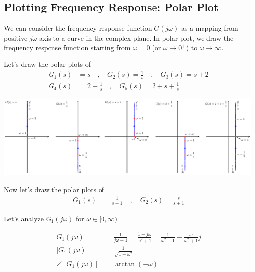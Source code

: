 \documentclass[twoside]{article}
\begin{document}
\newpage

\subsection{Plotting Frequency Response: Polar Plot}

We can consider the frequency response function $G(j \omega)$
as a mapping from positive $j \omega$ axis to a curve in 
the complex plane. In polar plot, we draw the frequency response
function starting from $\omega = 0$ (or $\omega \to 0^+$) to $\omega
\to \infty$.

Let's draw the polar plots of 
%
\begin{align*}
 G_1(s) &= s
 \quad , \quad
 G_2(s) = \frac{1}{s}
 \quad , \quad
 G_3(s) = s + 2
\\
 G_4(s) &= 2 + \frac{1}{s}
\quad , \quad
 G_5(s) = 2 + s +  \frac{1}{s}
\end{align*}

\vspace{6 pt}

  \begin{minipage}[h]{1\linewidth}
    \begin{center}
      \includegraphics[width=0.99\textwidth]{polar}
    \end{center}
  \end{minipage}

\vspace{6 pt}

Now let's draw the polar plots of 
%
\begin{align*}
 G_1(s) &= \frac{1}{s+1}
 \quad , \quad
 G_2(s) = \frac{s}{s+1}
\end{align*}

Let's analyze $G_1(j \omega)$ for $\omega \in [0 , \infty)$

\begin{align*}
 G_1(j \omega) &= \frac{1}{j \omega +1} = \frac{1 - j \omega}{\omega^2 +1} 
= \frac{1}{\omega^2 +1} - \frac{\omega}{\omega^2 +1} j
\\
| G_1(j \omega) | &= \frac{1}{ \sqrt{1 + \omega^2} }
\\
\angle [ G_1(j \omega) ] &= \arctan (-\omega) 
\end{align*}
\end{document}
